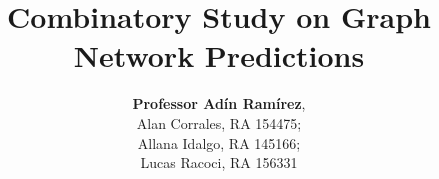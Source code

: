 \documentclass[11pt,a4paper]{article}
\begin{document}
\sloppy





\tableofcontents

\title{Combinatory Study on Graph Network Predictions}

\author{
    \normalsize
    \textbf{Professor Adín Ramírez},
    \normalsize
    \\
    \normalsize
    Alan Corrales, RA 154475; \\
    Allana Idalgo, RA 145166; \\
    Lucas  Racoci, RA 156331
}
\date{\vspace{-5ex}}
\maketitle


\vspace*{0.5cm}

\begin{spacing}{1.15}

\setcounter{page}{1}


\setcounter{page}{1}







\end{spacing}

{\small
\begin{singlespace}


\end{singlespace}
}


\end{document}
